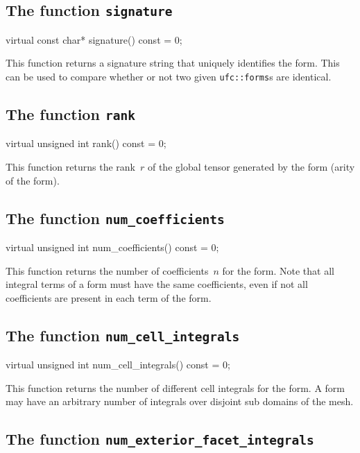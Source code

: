\subsection{The function \texttt{signature}}

\begin{code}
virtual const char* signature() const = 0;
\end{code}

This function returns a signature string that uniquely identifies the
form. This can be used to compare whether or not two given
\texttt{ufc::forms}s are identical.

\subsection{The function \texttt{rank}}

\begin{code}
virtual unsigned int rank() const = 0;
\end{code}

This function returns the rank~$r$ of the global tensor generated by
the form (arity of the form).

\subsection{The function \texttt{num\_coefficients}}

\begin{code}
virtual unsigned int num_coefficients() const = 0;
\end{code}

This function returns the number of coefficients~$n$ for the form.
Note that all integral terms of a form must have the same
coefficients, even if not all coefficients are present in each term of
the form.

\subsection{The function \texttt{num\_cell\_integrals}}

\begin{code}
virtual unsigned int num_cell_integrals() const = 0;
\end{code}

This function returns the number of different cell integrals for the
form. A form may have an arbitrary number of integrals over disjoint
sub domains of the mesh.

\subsection{The function \texttt{num\_exterior\_facet\_integrals}}

